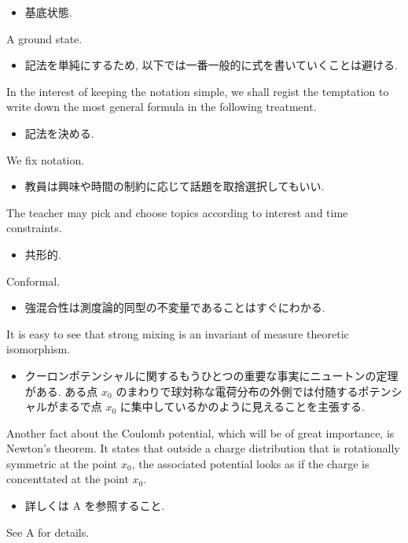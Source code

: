 \documentclass[openany, a4paper, oneside]{jsbook}
\begin{document}
\begin{itemize}
\item 基底状態.
\end{itemize}
A ground state.

\begin{itemize}
\item 記法を単純にするため, 以下では一番一般的に式を書いていくことは避ける. \cite{LiebSeiringer1}
\end{itemize}
In the interest of keeping the notation simple, we shall regist the temptation to write down
the most general formula in the following treatment.

\begin{itemize}
\item 記法を決める.
\end{itemize}
We fix notation.

\begin{itemize}
\item 教員は興味や時間の制約に応じて話題を取捨選択してもいい. \cite{CharlesWeibel1}
\end{itemize}
The teacher may pick and choose topics according to interest and time constraints.

\begin{itemize}
\item 共形的.
\end{itemize}
Conformal.

\begin{itemize}
\item 強混合性は測度論的同型の不変量であることはすぐにわかる.
\end{itemize}
It is easy to see that strong mixing is an invariant of measure theoretic isomorphism.

\begin{itemize}
\item クーロンポテンシャルに関するもうひとつの重要な事実にニュートンの定理がある.
ある点 $x_0$ のまわりで球対称な電荷分布の外側では付随するポテンシャルがまるで点
$x_0$ に集中しているかのように見えることを主張する. \cite{LiebSeiringer1}
\end{itemize}
Another fact about the Coulomb potential, which will be of great importance,
is Newton's theorem.
It states that outside a charge distribution that is rotationally symmetric at the
point $x_0$, the associated potential looks as if the charge is concenttated at the point $x_0$.

\begin{itemize}
\item 詳しくは A を参照すること.
\end{itemize}
See A for details.
\end{document}
